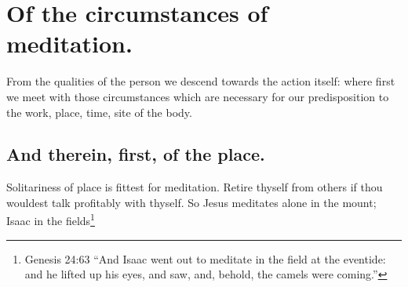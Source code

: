 \chapter{Of the circumstances of meditation.}
From the qualities of the person we descend towards the action itself: where first we meet with those circumstances which are necessary for our predisposition to the work, place, time, site of the body. 

\section{And therein, first, of the place.}
Solitariness of place is fittest for meditation. Retire thyself from others if thou wouldest talk profitably with thyself. So Jesus meditates alone in the mount; Isaac in the fields\footnote{Genesis 24:63 ``And Isaac went out to meditate in the field at the eventide: and he lifted up his eyes, and saw, and, behold, the camels were coming.''} 
